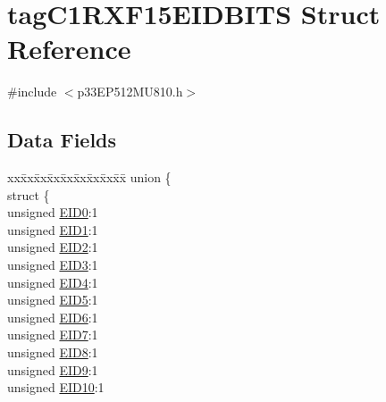 \hypertarget{structtag_c1_r_x_f15_e_i_d_b_i_t_s}{}\section{tag\+C1\+R\+X\+F15\+E\+I\+D\+B\+I\+TS Struct Reference}
\label{structtag_c1_r_x_f15_e_i_d_b_i_t_s}


{\ttfamily \#include $<$p33\+E\+P512\+M\+U810.\+h$>$}

\subsection*{Data Fields}
\begin{DoxyCompactItemize}
\item 
\begin{tabbing}
xx\=xx\=xx\=xx\=xx\=xx\=xx\=xx\=xx\=\kill
union \{\\
\>struct \{\\
\>\>unsigned \hyperlink{structtag_c1_r_x_f15_e_i_d_b_i_t_s_a9da8b7b30247e4f9cd8cc056549aa9fd}{EID0}:1\\
\>\>unsigned \hyperlink{structtag_c1_r_x_f15_e_i_d_b_i_t_s_afd6c139491d147c1262f3d051c6691e9}{EID1}:1\\
\>\>unsigned \hyperlink{structtag_c1_r_x_f15_e_i_d_b_i_t_s_a36ec62d8d3c5acd5d15e6691dc099a94}{EID2}:1\\
\>\>unsigned \hyperlink{structtag_c1_r_x_f15_e_i_d_b_i_t_s_ab895f7d0ac289a0383b607cbc62eebe2}{EID3}:1\\
\>\>unsigned \hyperlink{structtag_c1_r_x_f15_e_i_d_b_i_t_s_a136d5a709d6618d40acceccb43036656}{EID4}:1\\
\>\>unsigned \hyperlink{structtag_c1_r_x_f15_e_i_d_b_i_t_s_a8dffb2d86a6c184df505ae7c71a58710}{EID5}:1\\
\>\>unsigned \hyperlink{structtag_c1_r_x_f15_e_i_d_b_i_t_s_af8a8574102515d8f1a4b7fd1685d0532}{EID6}:1\\
\>\>unsigned \hyperlink{structtag_c1_r_x_f15_e_i_d_b_i_t_s_a84c3262e67f8d5fd387ac10bde6fa9b1}{EID7}:1\\
\>\>unsigned \hyperlink{structtag_c1_r_x_f15_e_i_d_b_i_t_s_acca25e0b7d86eb499d01f85222baea87}{EID8}:1\\
\>\>unsigned \hyperlink{structtag_c1_r_x_f15_e_i_d_b_i_t_s_ac6748f73d4ada8538b06548be4f396c2}{EID9}:1\\
\>\>unsigned \hyperlink{structtag_c1_r_x_f15_e_i_d_b_i_t_s_a9cea8e77ecbb72bd3b08102412793725}{EID10}:1\\

\end{tabbing}
\end{DoxyCompactItemize}
